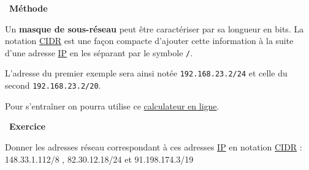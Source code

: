 \documentclass[
  11pt,
]{article}
\newcommand{\passthrough}[1]{#1}
\newcounter{exo}
\newenvironment{exercice}[1]
{\par \medskip   \addtocounter{exo}{1} \noindent  
\begin{bclogo}[arrondi =0.1,   noborder = true, logo=\bccrayon, marge=4]{~\textbf{Exercice} \textbf{\theexo} {\itshape #1} }  \par}
{
\end{bclogo}
 \par \bigskip }
\newenvironment{methode}[1]
{\par \medskip    \noindent  
 \begin {bclogo}[arrondi =0.1,logo=\bcoutil, marge=4,noborder = true] {~\textbf{Méthode}   {\itshape #1} }  \par}
{
\end{bclogo}
 \par \bigskip }
\begin{document}
\begin{methode}{}
Un \textbf{masque de sous-réseau} peut être caractériser par sa longueur
en bits. La notation
\href{https://fr.wikipedia.org/wiki/Sous-r\%C3\%A9seau}{CIDR} est une
façon compacte d'ajouter cette information à la suite d'une adresse
\href{https://fr.wikipedia.org/wiki/Internet_Protocol}{IP} en les
séparant par le symbole \passthrough{\lstinline!/!}.

L'adresse du premier exemple sera ainsi notée
\passthrough{\lstinline!192.168.23.2/24!} et celle du second
\passthrough{\lstinline!192.168.23.2/20!}.

Pour s'entraîner on pourra utilise ce
\href{https://cric.grenoble.cnrs.fr/Administrateurs/Outils/CalculMasque/}{calculateur
en ligne}.

\end{methode}

\begin{exercice}{}

Donner les adresses réseau correspondant à ces adresses
\href{https://fr.wikipedia.org/wiki/Internet_Protocol}{IP} en notation
\href{https://fr.wikipedia.org/wiki/Sous-r\%C3\%A9seau}{CIDR} :
148.33.1.112/8 , 82.30.12.18/24 et 91.198.174.3/19

\end{exercice}
\end{document}
